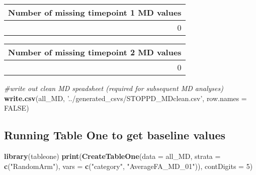\documentclass[]{article}
\newenvironment{Shaded}{\begin{snugshade}}{\end{snugshade}}
\newcommand{\KeywordTok}[1]{\textcolor[rgb]{0.13,0.29,0.53}{\textbf{#1}}}
\newcommand{\DataTypeTok}[1]{\textcolor[rgb]{0.13,0.29,0.53}{#1}}
\newcommand{\DecValTok}[1]{\textcolor[rgb]{0.00,0.00,0.81}{#1}}
\newcommand{\StringTok}[1]{\textcolor[rgb]{0.31,0.60,0.02}{#1}}
\newcommand{\CommentTok}[1]{\textcolor[rgb]{0.56,0.35,0.01}{\textit{#1}}}
\newcommand{\OtherTok}[1]{\textcolor[rgb]{0.56,0.35,0.01}{#1}}
\newcommand{\OperatorTok}[1]{\textcolor[rgb]{0.81,0.36,0.00}{\textbf{#1}}}
\newcommand{\NormalTok}[1]{#1}
\theoremstyle{definition}
\theoremstyle{definition}
\theoremstyle{definition}
\theoremstyle{remark}
\begin{document}
\begin{tabular}{r}
\hline
Number of missing timepoint 1 MD values\\
\hline
0\\
\hline
\end{tabular}

\begin{Shaded}
\end{Shaded}

\begin{tabular}{r}
\hline
Number of missing timepoint 2 MD values\\
\hline
0\\
\hline
\end{tabular}

\begin{Shaded}
\begin{Highlighting}[]
\CommentTok{#write out clean MD speadsheet (required for subsequent MD analyses)}
\KeywordTok{write.csv}\NormalTok{(all_MD, }\StringTok{'../generated_csvs/STOPPD_MDclean.csv'}\NormalTok{, }\DataTypeTok{row.names =} \OtherTok{FALSE}\NormalTok{)}
\end{Highlighting}
\end{Shaded}

\subsection{Running Table One to get baseline
values}\label{running-table-one-to-get-baseline-values-1}

\begin{Shaded}
\begin{Highlighting}[]
\KeywordTok{library}\NormalTok{(tableone)}
\KeywordTok{print}\NormalTok{(}\KeywordTok{CreateTableOne}\NormalTok{(}\DataTypeTok{data =}\NormalTok{ all_MD,}
               \DataTypeTok{strata =} \KeywordTok{c}\NormalTok{(}\StringTok{"RandomArm"}\NormalTok{),}
               \DataTypeTok{vars =} \KeywordTok{c}\NormalTok{(}\StringTok{"category"}\NormalTok{, }\StringTok{"AverageFA_MD_01"}\NormalTok{)), }\DataTypeTok{contDigits =} \DecValTok{5}\NormalTok{)}
\end{Highlighting}
\end{Shaded}
\end{document}
